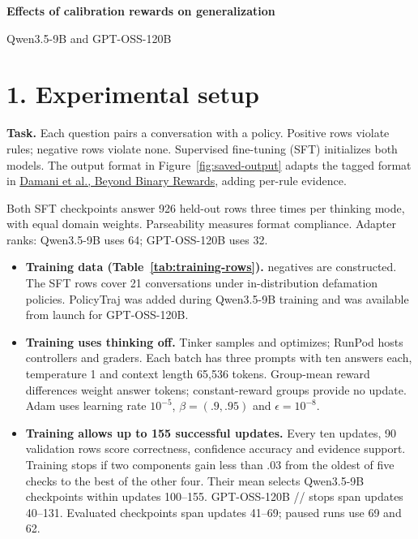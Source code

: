 \begingroup\fontsize{9.3}{9.7}\selectfont\setlength{\parskip}{0.06em}
{\LARGE\bfseries\color{ink}Effects of calibration rewards on generalization}\par
{\small\color{muted}Qwen3.5-9B and GPT-OSS-120B}\par
\section*{1. Experimental setup}
\textbf{Task.} Each question pairs a conversation with a policy. Positive rows violate rules; negative rows violate none. Supervised fine-tuning (SFT) initializes both models. The output format in Figure~\ref{fig:saved-output} adapts the tagged format in \href{https://arxiv.org/html/2507.16806v1#A2.SS2}{Damani et al., Beyond Binary Rewards}, adding per-rule evidence.

\par\vspace{1pt}
\par\vspace{1pt}
{\fontsize{8.5}{9.5}\selectfont Both SFT checkpoints answer 926 held-out rows three times per thinking mode, with equal domain weights. Parseability measures format compliance. Adapter ranks: Qwen3.5-9B uses 64; GPT-OSS-120B uses 32.}\par
\begin{itemize}
\item \textbf{Training data (Table~\ref{tab:training-rows}).} \SP{} negatives are constructed. The SFT rows cover 21 conversations under in-distribution defamation policies. PolicyTraj was added during Qwen3.5-9B training and was available from launch for GPT-OSS-120B.
\item \textbf{Training uses thinking off.} Tinker samples and optimizes; RunPod hosts controllers and graders. Each batch has three prompts with ten answers each, temperature 1 and context length 65,536 tokens. Group-mean reward differences weight answer tokens; constant-reward groups provide no update. Adam uses learning rate $10^{-5}$, $\beta=(.9,.95)$ and $\epsilon=10^{-8}$.
\item \textbf{Training allows up to 155 successful updates.} Every ten updates, 90 validation rows score correctness, confidence accuracy and evidence support. Training stops if two components gain less than .03 from the oldest of five checks to the best of the other four. Their mean selects Qwen3.5-9B checkpoints within updates 100--155. GPT-OSS-120B \armA{}/\armB{}/\armD{} stops span updates 40--131. Evaluated \armC{} checkpoints span updates 41--69; paused runs use 69 and 62.
\end{itemize}
